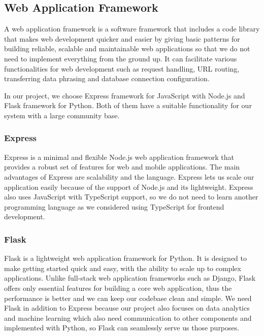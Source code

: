 \documentclass[12pt,oneside,openright,a4paper]{cpe-english-project}
\begin{document}
\subsection{Web Application Framework}

A web application framework is a software framework that includes a code library that makes web development quicker and easier by giving basic patterns for building reliable, scalable and maintainable web applications \cite{WhatIsWebFramework} so that we do not need to implement everything from the ground up. It can facilitate various functionalities for web development such as request handling, URL routing, transferring data phrasing and database connection configuration.

In our project, we choose Express framework for JavaScript with Node.js and Flask framework for Python. Both of them have a suitable functionality for our system with a large community base.

\subsubsection{Express}

Express is a minimal and flexible Node.js web application framework that provides a robust set of features for web and mobile applications. \cite{Express} The main advantages of Express are scalability and the language. Express lets us scale our application easily because of the support of Node.js and its lightweight. Express also uses JavaScript with TypeScript support, so we do not need to learn another programming language as we considered using TypeScript for frontend development.

\subsubsection{Flask}

Flask is a lightweight web application framework for Python. It is designed to make getting started quick and easy, with the ability to scale up to complex applications. \cite{Flask} Unlike full-stack web application frameworks such as Django, Flask offers only essential features for building a core web application, thus the performance is better and we can keep our codebase clean and simple. We need Flask in addition to Express because our project also focuses on data analytics and machine learning which also need communication to other components and implemented with Python, so Flask can seamlessly serve us those purposes.
\end{document}
